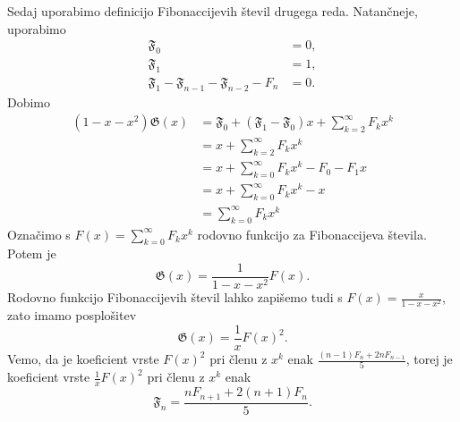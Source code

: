 \documentclass{article}
\begin{document}
    Sedaj uporabimo definicijo Fibonaccijevih števil drugega reda. Natančneje, uporabimo 
    \begin{align*}
        \mathfrak{F}_0 &= 0, \\
        \mathfrak{F}_1 &= 1, \\
        \mathfrak{F}_1 - \mathfrak{F}_{n-1} - \mathfrak{F}_{n-2} - F_n &= 0.
    \end{align*}
    Dobimo
    \begin{align*}
        (1 - x - x^2) \mathfrak{G} (x) &= \mathfrak{F}_0 + (\mathfrak{F}_1 - \mathfrak{F}_0) x + \sum_{k=2}^{\infty} F_k x^k \\
        &= x + \sum_{k=2}^{\infty} F_k x^k \\
        &= x + \sum_{k=0}^{\infty} F_k x^k - F_0 - F_1 x \\
        &= x + \sum_{k=0}^{\infty} F_k x^k - x \\
        &= \sum_{k=0}^{\infty} F_k x^k
    \end{align*}
    Označimo s $F(x) = \sum_{k=0}^{\infty} F_k x^k$ rodovno funkcijo za Fibonaccijeva števila. Potem je 
    $$  \mathfrak{G} (x) = \frac{1}{1 - x - x^2} F(x) \text{.}$$
    Rodovno funkcijo Fibonaccijevih števil lahko zapišemo tudi s $F(x) = \frac{x}{1 - x - x^2}$, zato 
    imamo posplošitev 
    $$  \mathfrak{G} (x) = \frac{1}{x} F(x)^2 \text{.}$$
    Vemo, da je koeficient vrste $F(x)^2$ pri členu z $x^k$ enak $\frac{(n-1) F_n + 2n F_{n-1}}{5}$,
    torej je koeficient vrste $\frac{1}{x} F(x)^2$ pri členu z $x^k$ enak $$ \mathfrak{F}_n = \frac{n F_{n+1} + 2 (n+1) F_n}{5} \text{.}$$
\end{document}
